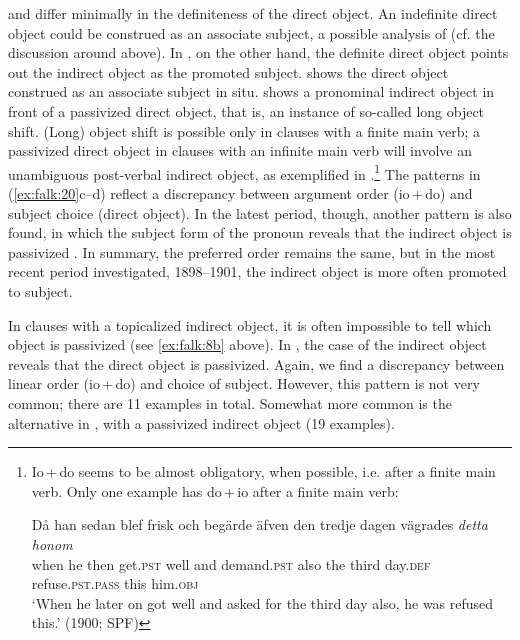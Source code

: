 \documentclass[output=paper]{langscibook}
\begin{document}
 and  differ minimally in the definiteness of the direct object. An indefinite direct object could be construed as an associate subject, a possible analysis of  (cf. the discussion around  above). In , on the other hand, the definite direct object points out the indirect object as the promoted subject.  shows the direct object construed as an associate subject in situ.  shows a pronominal indirect object in front of a passivized direct object, that is, an instance of so-called long object shift. (Long) object shift is possible only in clauses with a finite main verb; a passivized direct object in clauses with an infinite main verb will involve an unambiguous post-verbal indirect object, as exemplified in .{\footnote{Io\,+\,do seems to be almost obligatory, when possible, i.e. after a finite main verb. Only one example has do\,+\,io after a finite main verb:

\ea \gll Då    han  sedan  blef    frisk  och  begärde    äfven  den  tredje  dagen  vägrades \textit{detta}  \textit{honom}\\
         when  he    then  get.\textsc{pst}  well  and  demand.\textsc{pst}  also    the  third  day.\textsc{def}  refuse\textsc{.pst.pass}  this  him.\textsc{obj}\\
         \glt ‘When he later on got well and asked for the third day also, he was refused this.’ (1900; SPF)
\z}} The patterns in (\ref{ex:falk:20}c–d) reflect a discrepancy between argument order (io\,+\,do) and subject choice (direct object). In the latest period, though, another pattern is also found, in which the subject form of the pronoun reveals that the indirect object is passivized . In summary, the preferred order remains the same, but in the most recent period investigated, 1898–1901, the indirect object is more often promoted to subject.


In clauses with a topicalized indirect object, it is often impossible to tell which object is passivized (see \ref{ex:falk:8b} above). In , the case of the indirect object reveals that the direct object is passivized. Again, we find a discrepancy between linear order (io\,+\,do) and choice of subject. However, this pattern is not very common; there are 11 examples in total. Somewhat more common is the alternative in , with a passivized indirect object (19 examples).
\end{document}
